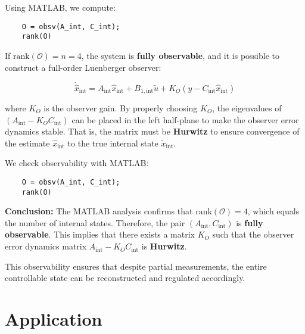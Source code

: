 \documentclass[]{report}
\begin{document}
Using MATLAB, we compute:

\begin{verbatim}
	O = obsv(A_int, C_int);
	rank(O)
\end{verbatim}

If $\text{rank}(\mathcal{O}) = n = 4$, the system is \textbf{fully observable}, and it is possible to construct a full-order Luenberger observer:

\[
\dot{\hat{x}}_{\text{int}} = A_{\text{int}} \hat{x}_{\text{int}} + B_{1,\text{int}} \tilde{u} + K_O(y - C_{\text{int}} \hat{x}_{\text{int}})
\]

where $K_O$ is the observer gain. By properly choosing $K_O$, the eigenvalues of $(A_{\text{int}} - K_O C_{\text{int}})$ can be placed in the left half-plane to make the observer error dynamics stable. That is, the matrix must be \textbf{Hurwitz} to ensure convergence of the estimate $\hat{x}_{\text{int}}$ to the true internal state $\tilde{x}_{\text{int}}$.

We check observability with MATLAB:

\begin{verbatim}
	O = obsv(A_int, C_int);
	rank(O)
\end{verbatim}

\textbf{Conclusion:}  
The MATLAB analysis confirms that $\text{rank}(\mathcal{O}) = 4$, which equals the number of internal states. Therefore, the pair $(A_{\text{int}}, C_{\text{int}})$ is \textbf{fully observable}. This implies that there exists a matrix $K_O$ such that the observer error dynamics matrix $A_{\text{int}} - K_O C_{\text{int}}$ is \textbf{Hurwitz}.


This observability ensures that despite partial measurements, the entire controllable state can be reconstructed and regulated accordingly.




\chapter{Application}
\end{document}
